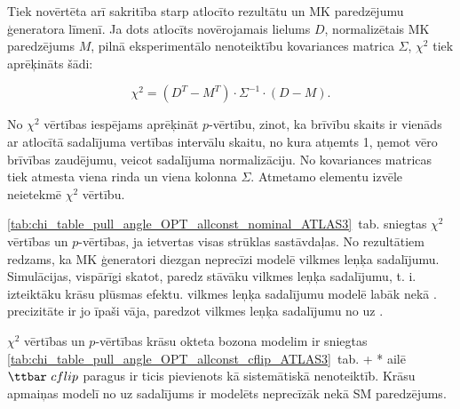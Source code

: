 Tiek novērtēta arī sakritība starp atlocīto rezultātu un MK paredzējumu ģeneratora līmenī. Ja dots atlocīts novērojamais lielums $D$, normalizētais MK paredzējums $M$, pilnā eksperimentālo nenoteiktību kovariances matrica $\Sigma$, $\chi^{2}$ tiek aprēķināts šādi:

\begin{equation}
  \chi^{2}=(D^{T}-M^{T})\cdot\Sigma^{-1}\cdot(D-M).
  \label{eq:chi2}
\end{equation}

No $\chi^{2}$ vērtības iespējams aprēķināt $p$-vērtību, zinot, ka brīvību skaits ir vienāds ar atlocītā sadalījuma vertības intervālu skaitu, no kura atņemts 1, ņemot vēro brīvības zaudējumu, veicot sadalījuma normalizāciju. No kovariances matricas tiek atmesta viena rinda un viena kolonna $\Sigma$. Atmetamo elementu izvēle neietekmē $\chi^{2}$ vērtību.

\ref{tab:chi_table_pull_angle_OPT_allconst_nominal_ATLAS3}~tab. sniegtas \pullangle $\chi^{2}$ vērtības un $p$-vērtības, ja ietvertas visas strūklas sastāvdaļas. No rezultātiem redzams, ka MK ģeneratori diezgan neprecīzi modelē vilkmes leņķa sadalījumu. Simulācijas, vispārīgi skatot, paredz stāvāku vilkmes leņķa sadalījumu, t. i. izteiktāku krāsu plūsmas efektu. \HERWIGpp vilkmes leņķa sadalījumu modelē labāk nekā .  precizitāte ir jo īpaši vāja, paredzot vilkmes leņķa sadalījumu no \scndleadingjet uz \leadingjet.

$\chi^{2}$ vērtības un $p$-vērtības krāsu okteta \PW bozona modelim ir sniegtas \ref{tab:chi_table_pull_angle_OPT_allconst_cflip_ATLAS3}~tab. \POWHEG+ * ailē $\ttbar\ cflip$ paragus ir ticis pievienots kā \ttbar sistemātiskā nenoteiktīb. Krāsu apmaiņas modelī \pullangle no \leadingjet uz \scndleadingjet sadalījums ir modelēts neprecīzāk nekā SM paredzējums. 
  






%
